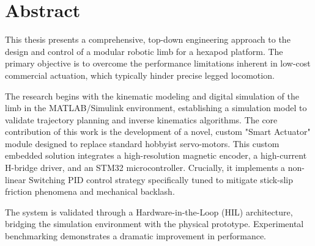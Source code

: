 \chapter*{Abstract}

This thesis presents a comprehensive, top-down engineering approach to the design and control of a modular robotic
limb for a hexapod platform. The primary objective is to overcome the performance limitations inherent in low-cost
commercial actuation, which typically hinder precise legged locomotion.

The research begins with the kinematic modeling and digital simulation of the limb in the MATLAB/Simulink environment,
establishing a simulation model to validate trajectory planning and inverse kinematics algorithms. The core contribution
of this work is the development of a novel, custom "Smart Actuator" module designed to replace standard hobbyist
servo-motors. This custom embedded solution integrates a high-resolution magnetic encoder, a high-current H-bridge
driver, and an STM32 microcontroller. Crucially, it implements a non-linear Switching PID control strategy specifically
tuned to mitigate stick-slip friction phenomena and mechanical backlash.

The system is validated through a Hardware-in-the-Loop (HIL) architecture, bridging the simulation environment with the
physical prototype. Experimental benchmarking demonstrates a dramatic improvement in performance.